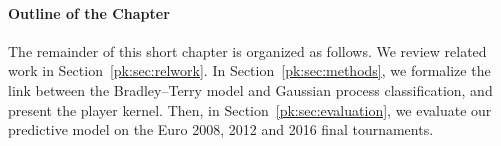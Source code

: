 \paragraph{Outline of the Chapter}
The remainder of this short chapter is organized as follows.
We review related work in Section~\ref{pk:sec:relwork}.
In Section~\ref{pk:sec:methods}, we formalize the link between the Bradley--Terry model and Gaussian process classification, and present the player kernel.
Then, in Section~\ref{pk:sec:evaluation}, we evaluate our predictive model on the Euro 2008, 2012 and 2016 final tournaments.
